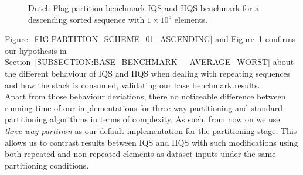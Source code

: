 \begin{figure}
    \caption{Dutch Flag partition benchmark IQS and IIQS benchmark for a descending sorted sequence with $1\times10^5$ elements.}
    \label{FIG:PARTITION_SCHEME_01_DESCENDING}
\end{figure}


Figure~\ref{FIG:PARTITION_SCHEME_01_ASCENDING} and Figure~\ref{FIG:PARTITION_SCHEME_01_DESCENDING} confirms our hypothesis in Section~\ref{SUBSECTION:BASE_BENCHMARK__AVERAGE_WORST} about the different behaviour of IQS and IIQS when dealing with repeating sequences and how the stack is consumed, validating our base benchmark results.\\

Apart from those behaviour deviations, there no noticeable difference between running time of our implementations for three-way partitioning and standard partitioning algorithms in terms of complexity. As such, from now on we use \textit{three-way-partition} as our default implementation for the partitioning stage. This allows us to contrast results between IQS and IIQS with such modifications using both repeated and non repeated elements as dataset inputs under the same partitioning conditions.\\

\FloatBarrier